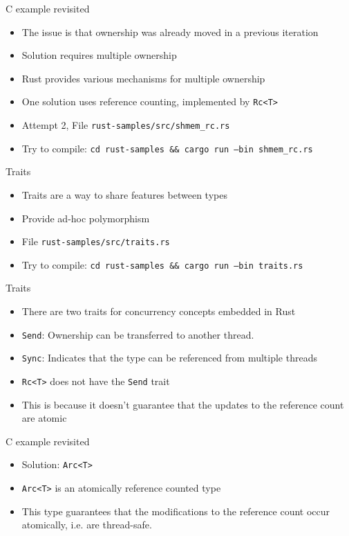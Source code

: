 \documentclass{beamer}
\begin{document}
\begin{frame}{C example revisited}
    \begin{itemize}
        \item The issue is that ownership was already moved in a previous iteration
        \item Solution requires multiple ownership
        \item Rust provides various mechanisms for multiple ownership
        \item One solution uses reference counting, implemented by \texttt{Rc<T>}
        \item Attempt 2, File \texttt{rust-samples/src/shmem\_rc.rs}
        \item Try to compile: \texttt{cd rust-samples \&\& cargo run --bin shmem\_rc.rs}
    \end{itemize}
\end{frame}

\begin{frame}{Traits}
    \begin{itemize}
        \item Traits are a way to share features between types
        \item Provide ad-hoc polymorphism
        \item File \texttt{rust-samples/src/traits.rs}
        \item Try to compile: \texttt{cd rust-samples \&\& cargo run --bin traits.rs}
    \end{itemize}
\end{frame}

\begin{frame}{Traits}
    \begin{itemize}
        \item There are two traits for concurrency concepts embedded in Rust
        \item \texttt{Send}: Ownership can be transferred to another thread.
        \item \texttt{Sync}: Indicates that the type can be referenced from multiple threads
        \item \texttt{Rc<T>} does not have the \texttt{Send} trait
        \item This is because it doesn't guarantee that the updates to the reference count are atomic
    \end{itemize}
\end{frame}

\begin{frame}{C example revisited}
    \begin{itemize}
        \item Solution: \texttt{Arc<T>}
        \item \texttt{Arc<T>} is an atomically reference counted type
        \item This type guarantees that the modifications to the reference count occur atomically, i.e. are thread-safe.
    \end{itemize}
\end{frame}
\end{document}
